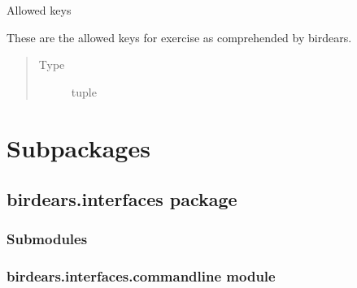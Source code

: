 \documentclass[letterpaper,10pt,english]{sphinxmanual}
\begin{document}

\begin{fulllineitems}
\label{\detokenize{birdears:birdears.KEYS}}
Allowed keys

These are the allowed keys for exercise as comprehended by birdears.
\begin{quote}\begin{description}
\item[{Type}] \leavevmode
tuple

\end{description}\end{quote}

\end{fulllineitems}



\section{Subpackages}
\label{\detokenize{birdears:subpackages}}

\subsection{birdears.interfaces package}
\label{\detokenize{birdears.interfaces:module-birdears.interfaces}}\label{\detokenize{birdears.interfaces:birdears-interfaces-package}}\label{\detokenize{birdears.interfaces::doc}}

\subsubsection{Submodules}
\label{\detokenize{birdears.interfaces:submodules}}

\subsubsection{birdears.interfaces.commandline module}
\label{\detokenize{birdears.interfaces:module-birdears.interfaces.commandline}}\label{\detokenize{birdears.interfaces:birdears-interfaces-commandline-module}}
\end{document}
